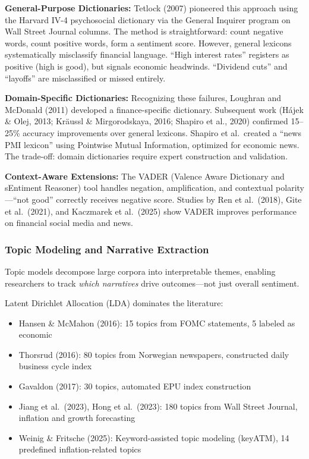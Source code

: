 \documentclass[12pt,a4paper]{article}
\begin{document}
\textbf{General-Purpose Dictionaries:} Tetlock (2007) pioneered this approach using the Harvard IV-4 psychosocial dictionary via the General Inquirer program on Wall Street Journal columns. The method is straightforward: count negative words, count positive words, form a sentiment score. However, general lexicons systematically misclassify financial language. ``High interest rates'' registers as positive (high is good), but signals economic headwinds. ``Dividend cuts'' and ``layoffs'' are misclassified or missed entirely.

\textbf{Domain-Specific Dictionaries:} Recognizing these failures, Loughran and McDonald (2011) developed a finance-specific dictionary. Subsequent work (Hájek \& Olej, 2013; Kräussl \& Mirgorodskaya, 2016; Shapiro et al., 2020) confirmed 15--25\% accuracy improvements over general lexicons. Shapiro et al.\ created a ``news PMI lexicon'' using Pointwise Mutual Information, optimized for economic news. The trade-off: domain dictionaries require expert construction and validation.

\textbf{Context-Aware Extensions:} The VADER (Valence Aware Dictionary and sEntiment Reasoner) tool handles negation, amplification, and contextual polarity—``not good'' correctly receives negative score. Studies by Ren et al.\ (2018), Gite et al.\ (2021), and Kaczmarek et al.\ (2025) show VADER improves performance on financial social media and news.

\subsubsection{Topic Modeling and Narrative Extraction}

Topic models decompose large corpora into interpretable themes, enabling researchers to track \textit{which narratives} drive outcomes—not just overall sentiment.

Latent Dirichlet Allocation (LDA) dominates the literature:
\begin{itemize}
\item Hansen \& McMahon (2016): 15 topics from FOMC statements, 5 labeled as economic
\item Thorsrud (2016): 80 topics from Norwegian newspapers, constructed daily business cycle index
\item Gavaldon (2017): 30 topics, automated EPU index construction
\item Jiang et al.\ (2023), Hong et al.\ (2023): 180 topics from Wall Street Journal, inflation and growth forecasting
\item Weinig \& Fritsche (2025): Keyword-assisted topic modeling (keyATM), 14 predefined inflation-related topics
\end{itemize}
\end{document}
